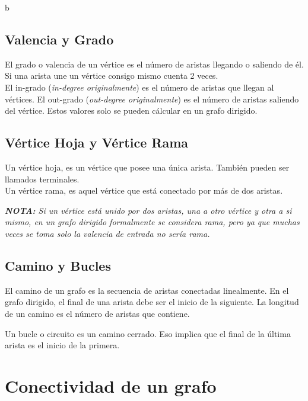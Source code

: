 b\documentclass[11pt]{article}
\theoremstyle{plain}
\begin{document}
        \subsection{Valencia y Grado} %
        \label{sub:valencia_y_grado}
            El grado o valencia de un vértice es el número de aristas llegando o saliendo de él. Si una arista une un vértice consigo mismo cuenta 2 veces.\\

            El in-grado (\textit{in-degree originalmente}) es el número de aristas que llegan al vértices. El out-grado (\textit{out-degree originalmente}) es el número de aristas saliendo del vértice. Estos valores solo se pueden cálcular en un grafo dirigido.
        \subsection{Vértice Hoja y Vértice Rama} %
        \label{sub:vértice_hoja}
            Un vértice hoja, es un vértice que posee una única arista. También pueden ser llamados terminales.\\
            Un vértice rama, es aquel vértice que está conectado por más de dos aristas.
            \begin{center}
                \textit{\textbf{NOTA:} Si un vértice está unido por dos aristas, una a otro vértice y otra a si mismo, en un grafo dirigido formalmente se considera rama, pero ya que muchas veces se toma solo la valencia de entrada no sería rama.}
            \end{center}
        \subsection{Camino y Bucles} %
        \label{sub:camino_y_bucles}
            El camino de un grafo es la secuencia de aristas conectadas linealmente. En el grafo dirigido, el final de una arista debe ser el inicio de la siguiente. La longitud de un camino es el número de aristas que contiene. 

            Un bucle o circuito es un camino cerrado. Eso implica que el final de la última arista es el inicio de la primera.
    \section{Conectividad de un grafo} %
    \label{sec:conectividad_de_un_grafo}
\end{document}
